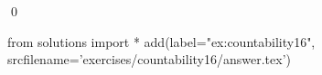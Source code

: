 
\begin{ex} 
  \label{ex:countability16}
  
  \qed
\end{ex} 
\begin{python0}
from solutions import *
add(label="ex:countability16",
    srcfilename='exercises/countability16/answer.tex') 
\end{python0}
